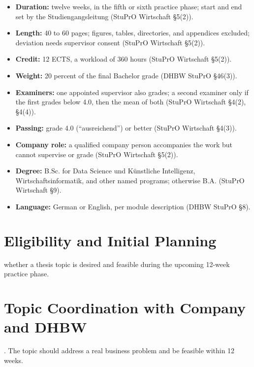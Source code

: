 \documentclass{../sharedAssets/tufte}
\begin{document}
\begin{itemize}\setlength\itemsep{0.2em}
    \item \textbf{Duration:} twelve weeks, in the fifth or sixth practice phase; start and end set by the Studiengangsleitung (StuPrO Wirtschaft \S5(2)).
    \item \textbf{Length:} 40 to 60 pages; figures, tables, directories, and appendices excluded; deviation needs supervisor consent (StuPrO Wirtschaft \S5(2)).
    \item \textbf{Credit:} 12 ECTS, a workload of 360 hours (StuPrO Wirtschaft \S5(2)).
    \item \textbf{Weight:} 20 percent of the final Bachelor grade (DHBW StuPrO \S46(3)).
    \item \textbf{Examiners:} one appointed supervisor also grades; a second examiner only if the first grades below 4.0, then the mean of both (StuPrO Wirtschaft \S4(2), \S4(4)).
    \item \textbf{Passing:} grade 4.0 (``ausreichend'') or better (StuPrO Wirtschaft \S4(3)).
    \item \textbf{Company role:} a qualified company person accompanies the work but cannot supervise or grade (StuPrO Wirtschaft \S5(2)).
    \item \textbf{Degree:} B.Sc. for Data Science und K\"unstliche Intelligenz, Wirtschaftsinformatik, and other named programs; otherwise B.A. (StuPrO Wirtschaft \S9).
    \item \textbf{Language:} German or English, per module description (DHBW StuPrO \S8).
\end{itemize}


\section{Eligibility and Initial Planning}
 whether a thesis topic is desired and feasible during the upcoming 12-week practice phase.

\section{Topic Coordination with Company and DHBW}
. The topic should address a real business problem and be feasible within 12 weeks.
\end{document}

